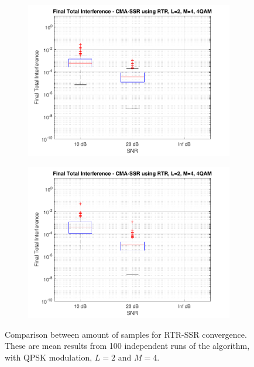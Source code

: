 \begin{figure}
\begin{subfigure}[b]{0.45\textwidth}
		\includegraphics[width=\linewidth]{./figs/BF_RTR_TIfinal_4QAM_L=2_M=4_K=200.pdf}
		\label{fig:rtr_tidist200}
	\end{subfigure}
	\begin{subfigure}[b]{0.45\textwidth}
		\includegraphics[width=\linewidth]{./figs/BF_RTR_TIfinal_4QAM_L=2_M=4_K=1000.pdf}
		\label{fig:rtr_tidist1000}
	\end{subfigure}
	\caption{Comparison between amount of samples for RTR-SSR convergence. These are mean results from 100 independent runs of the algorithm, with QPSK modulation, $L=2$ and $M=4$.}
	\label{fig:CMA_RTR_qpsk_L2M4}
\end{figure}

